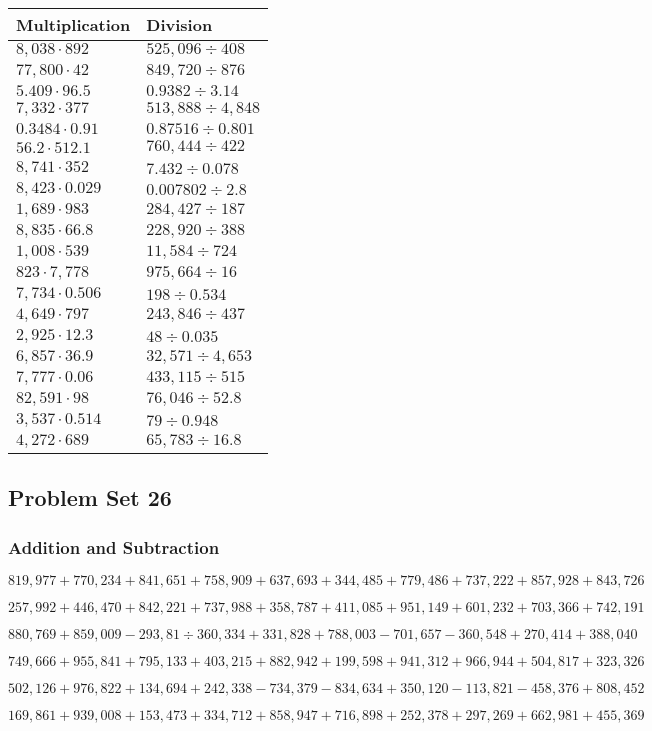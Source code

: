 \begin{longtable}[]{@{}ll@{}}
\toprule
Multiplication & Division\tabularnewline
\midrule
\endhead
\(8,038\cdot892\) & \(525,096÷408\)\tabularnewline
\(77,800\cdot42\) & \(849,720÷876\)\tabularnewline
\(5.409\cdot96.5\) & \(0.9382÷3.14\)\tabularnewline
\(7,332\cdot377\) & \(513,888÷4,848\)\tabularnewline
\(0.3484\cdot0.91\) & \(0.87516÷0.801\)\tabularnewline
\(56.2\cdot512.1\) & \(760,444÷422\)\tabularnewline
\(8,741\cdot352\) & \(7.432÷0.078\)\tabularnewline
\(8,423\cdot0.029\) & \(0.007802 ÷2.8\)\tabularnewline
\(1,689\cdot983\) & \(284,427÷187\)\tabularnewline
\(8,835\cdot66.8\) & \(228,920÷388\)\tabularnewline
\(1,008\cdot539\) & \(11,584÷724\)\tabularnewline
\(823\cdot7,778\) & \(975,664÷16\)\tabularnewline
\(7,734\cdot0.506\) & \(198÷0.534\)\tabularnewline
\(4,649\cdot797\) & \(243,846÷437\)\tabularnewline
\(2,925\cdot12.3\) & \(48÷0.035\)\tabularnewline
\(6,857\cdot36.9\) & \(32,571÷4,653\)\tabularnewline
\(7,777\cdot0.06\) & \(433,115÷515\)\tabularnewline
\(82,591\cdot98\) & \(76,046÷52.8\)\tabularnewline
\(3,537\cdot0.514\) & \(79÷0.948\)\tabularnewline
\(4,272\cdot689\) & \(65,783÷16.8\)\tabularnewline
\bottomrule
\end{longtable}

\hypertarget{problem-set-26-5}{%
\subsection{Problem Set 26}\label{problem-set-26-5}}

\hypertarget{addition-and-subtraction-331}{%
\subsubsection{Addition and
Subtraction}\label{addition-and-subtraction-331}}

\(819,977+770,234+841,651+758,909+637,693+344,485+779,486+737,222+857,928+ 843,726\)

\(257,992+446,470+842,221+737,988+358,787+411,085+951,149+601,232+703,366+742,191\)

\(880,769+859,009-293,81÷360,334+331,828+788,003-701,657-360,548+270,414+388,040\)

\(749,666+955,841+795,133+403,215+882,942+199,598+941,312+966,944+504,817+323,326\)

\(502,126+976,822+134,694+242,338-734,379-834,634+350,120-113,821-458,376+808,452\)

\(169,861+939,008+153,473+334,712+858,947+716,898+252,378+297,269+662,981+455,369\)

